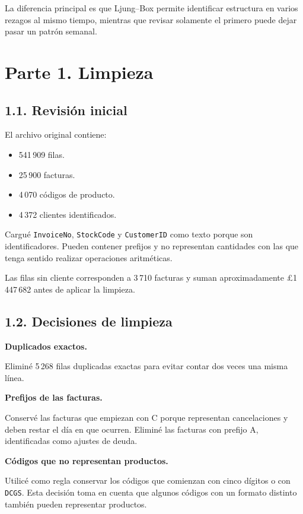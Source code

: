 \documentclass[11pt,letterpaper]{article}
\begin{document}
La diferencia principal es que Ljung--Box permite identificar estructura en varios rezagos al mismo tiempo, mientras que revisar solamente el primero puede dejar pasar un patrón semanal.

\section*{Parte 1. Limpieza}

\subsection*{1.1. Revisión inicial}

El archivo original contiene:
\begin{itemize}
    \item 541\,909 filas.
    \item 25\,900 facturas.
    \item 4\,070 códigos de producto.
    \item 4\,372 clientes identificados.
\end{itemize}

Cargué \texttt{InvoiceNo}, \texttt{StockCode} y \texttt{CustomerID} como texto porque son identificadores. Pueden contener prefijos y no representan cantidades con las que tenga sentido realizar operaciones aritméticas.

Las filas sin cliente corresponden a 3\,710 facturas y suman aproximadamente \pounds1\,447\,682 antes de aplicar la limpieza.

\subsection*{1.2. Decisiones de limpieza}

\textbf{Duplicados exactos.}

Eliminé 5\,268 filas duplicadas exactas para evitar contar dos veces una misma línea.

\textbf{Prefijos de las facturas.}

Conservé las facturas que empiezan con C porque representan cancelaciones y deben restar el día en que ocurren. Eliminé las facturas con prefijo A, identificadas como ajustes de deuda.

\textbf{Códigos que no representan productos.}

Utilicé como regla conservar los códigos que comienzan con cinco dígitos o con \texttt{DCGS}. Esta decisión toma en cuenta que algunos códigos con un formato distinto también pueden representar productos.
\end{document}
